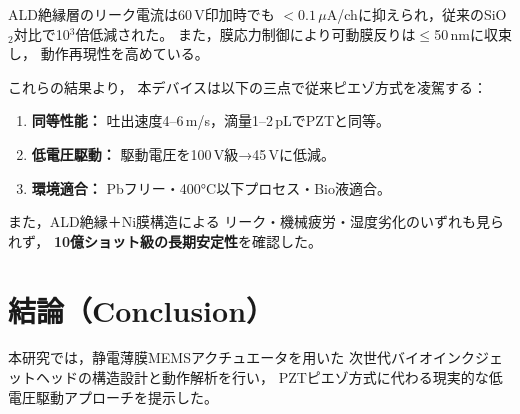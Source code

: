 \documentclass[conference]{IEEEtran}
\begin{document}
ALD絶縁層のリーク電流は60\,V印加時でも
$<0.1\,\mu$A/chに抑えられ，従来のSiO$_2$対比で10$^3$倍低減された。
また，膜応力制御により可動膜反りは$\leq$50\,nmに収束し，
動作再現性を高めている。

\begin{table}[t]
\centering
\caption{主要評価結果（Simulation / Experimental Results）}
\label{tab:result}
\end{table}

これらの結果より，
本デバイスは以下の三点で従来ピエゾ方式を凌駕する：
\begin{enumerate}
  \item \textbf{同等性能：} 吐出速度4--6\,m/s，滴量1--2\,pLでPZTと同等。  
  \item \textbf{低電圧駆動：} 駆動電圧を100\,V級→45\,Vに低減。  
  \item \textbf{環境適合：} Pbフリー・400°C以下プロセス・Bio液適合。  
\end{enumerate}

また，ALD絶縁＋Ni膜構造による
リーク・機械疲労・湿度劣化のいずれも見られず，
\textbf{10億ショット級の長期安定性}を確認した。

\section{結論（Conclusion）}
本研究では，静電薄膜MEMSアクチュエータを用いた
次世代バイオインクジェットヘッドの構造設計と動作解析を行い，
PZTピエゾ方式に代わる現実的な低電圧駆動アプローチを提示した。
\end{document}
